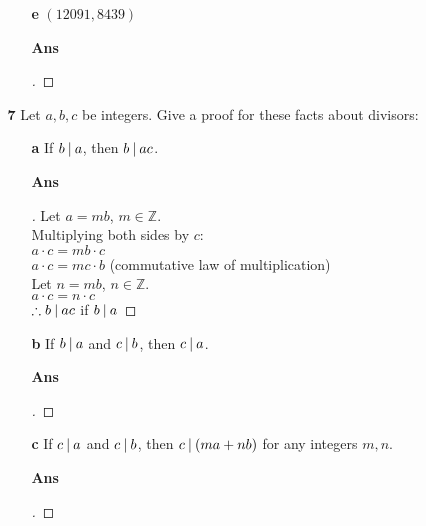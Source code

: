 \documentclass[paper=usletter, fontsize=12pt]{article}
\begin{document}
\begin{itemize}
\begin{itemize}
\begin{itemize}
                    \item[\textbf{e}] $(12091, 8439)$
                    \item[\textbf{Ans}]
                    \begin{proof}[\unskip\nopunct]
                    \end{proof}
                    \vspace{0.2in}

                \end{itemize}

                \item[\textbf{7}] Let $a, b, c$ be integers. Give a proof for
                these facts about divisors:

                \begin{itemize}

                    \item[\textbf{a}] If $b \:\vert\: a$, then $b \:\vert\: ac$.
                    \item[\textbf{Ans}]
                    \begin{proof}[\unskip\nopunct]
                        Let $a = mb$, $m \in \mathbb{Z}$. \\
                        Multiplying both sides by $c$: \\
                        $a \cdot c = mb \cdot c$ \\
                        $a \cdot c = mc \cdot b$ (commutative law of multiplication) \\
                        Let $n = mb$, $n \in \mathbb{Z}$. \\
                        $a \cdot c = n \cdot c$ \\
                        $\therefore b \:\vert\: ac$ if $b \:\vert\: a$ \qedhere
                    \end{proof}
                    \vspace{0.2in}

                    \item[\textbf{b}] If $b \:\vert\: a$ and $c \:\vert\: b$, then $c
                    \:\vert\: a$.
                    \item[\textbf{Ans}]
                    \begin{proof}[\unskip\nopunct]
                    \end{proof}
                    \vspace{0.2in}

                    \item[\textbf{c}] If $c \:\vert\: a$ and $c \:\vert\: b$, then $c
                    \:\vert\: (ma + nb)$ for any integers $m, n$.
                    \item[\textbf{Ans}]
                    \begin{proof}[\unskip\nopunct]
                    \end{proof}
                    \vspace{0.2in}


\end{itemize}
\end{itemize}
\end{itemize}
\end{document}
